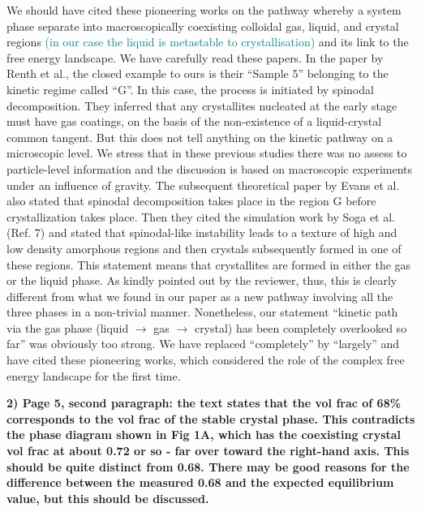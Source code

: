\documentclass[11pt,a4paper]{article}
\newenvironment{referee}%
{\bigskip\singlespacing\bf}%
{\par\bigskip}
\begin{document}
We should have cited these pioneering works on the pathway whereby a system phase separate into macroscopically coexisting colloidal gas, liquid, and crystal regions \textcolor{teal}{(in our case the liquid is metastable to crystallisation)} and its link to the free energy landscape. We have carefully read these papers. In the paper by Renth et al., the closed example to ours is their ``Sample 5'' belonging to the kinetic regime called ``G''. In this case, the process is initiated by spinodal decomposition. They inferred that any crystallites nucleated at the early stage must have gas coatings, on the basis of the non-existence of a liquid-crystal common tangent. But this does not tell anything on the kinetic pathway on a microscopic level. We stress that in these previous studies there was no assess to particle-level information and the discussion is based on macroscopic experiments under an influence of gravity. The subsequent theoretical paper by Evans et al. also stated that spinodal decomposition takes place in the region G before crystallization takes place. Then they cited the 
simulation work by Soga et al. (Ref. 7) and stated that spinodal-like instability leads to a texture of high and low density amorphous regions and then crystals subsequently formed in one of these regions. This statement means that crystallites are formed in either the gas or the liquid phase. As kindly pointed out by the reviewer, thus, this is clearly different from what we found in our paper as a new pathway involving all the three phases in a non-trivial manner. 
Nonetheless, our statement ``kinetic path via the gas phase (liquid $\rightarrow$ gas $\rightarrow$ crystal) has been completely overlooked so far'' was obviously too strong. We have replaced ``completely'' by ``largely'' and have cited these pioneering works, which considered the role of the complex free energy landscape for the first time. 



\begin{referee}
2) Page 5, second paragraph: the text states that the vol frac of 68\% corresponds to the vol frac of the stable crystal phase. This contradicts the phase diagram shown in Fig 1A, which has the coexisting crystal vol frac at about 0.72 or so - far over toward the right-hand axis. This should be quite distinct from 0.68. There may be good reasons for the difference between the measured 0.68 and the expected equilibrium value, but this should be discussed.
\end{referee}
\end{document}
